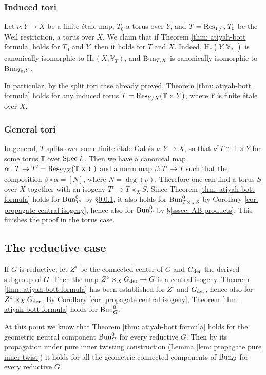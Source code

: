\documentclass[reqno]{amsart}
\numberwithin{equation}{subsection}
\theoremstyle{definition}
\def\TT{\mathbb{T}}
\def\VV{\mathbb{V}}
\newcommand{\Bun}{\textup{Bun}}
\newcommand{\Res}{\textup{Res}}
\newcommand\Spec{\textup{Spec}\ }
\newcommand{\der}{\textup{der}}
\renewcommand\a\alpha
\renewcommand\b\beta
\newcommand{\co}{\colon}
\newcommand{\rH}{\ensuremath{\mathrm{H}}\xspace}
\begin{document}
\subsubsection{Induced tori}\label{sss:induced tori}
Let $\nu: Y\to X$ be a finite \'etale map, $T_{0}$ a torus over $Y$, and $T=\Res_{Y/X}T_{0}$ be the Weil restriction, a torus over $X$. We claim that if Theorem \ref{thm: atiyah-bott formula} holds for $T_{0}$ and $Y$, then it holds for $T$ and $X$. Indeed, $\rH_{*}(Y,\VV_{T_{0}})$ is canonically isomorphic to $\rH_{*}(X,\VV_{T})$, and $\Bun_{T,X}$ is canonically isomorphic to $\Bun_{T_{0},Y}$. 

In particular, by the split tori case already proved, Theorem \ref{thm: atiyah-bott formula} holds for any induced torus $T=\Res_{Y/X}(\TT\times Y)$, where $Y$ is finite \'etale over $X$.  


\subsubsection{General tori}
In general, $T$ splits over some finite \'etale Galois $\nu \co  Y \rightarrow X$, so that $\nu^{*}T\cong \TT\times Y$ for some torus $\TT$ over $\Spec k$. Then we have a canonical map $\a: T\to T'=\Res_{Y/X}(\TT\times Y)$ and a norm map $\b: T'\to T$ such that the composition $\b\circ\a=[N]$, where $N=\deg(\nu)$. Therefore one can find a torus $S$ over $X$ together with an isogeny $T'\to T\times_{X} S$. Since Theorem \ref{thm: atiyah-bott formula} holds for $\Bun^{0}_{T'}$ by \S\ref{sss:induced tori}, it also holds for $\Bun_{T\times_{X} S}^{0}$ by Corollary \ref{cor: propagate central isogeny}, hence also for $\Bun^{0}_{T}$ by \S\ref{sssec: AB products}. This finishes the proof in the torus case. 



\subsection{The reductive case}
If $G$ is reductive, let $Z^\circ$ be the connected center of $G$ and $G_{\der}$ the derived subgroup of $G$. Then the map $Z^\circ \times_X G_{\der} \rightarrow G$ is a central isogeny. Theorem \ref{thm: atiyah-bott formula} has been established for $Z^\circ$ and $G_{\der}$, hence also for $Z^\circ \times_X G_{\der}$. By Corollary \ref{cor: propagate central isogeny}, Theorem \ref{thm: atiyah-bott formula} holds for $\Bun_G^0$.

At this point we know that Theorem \ref{thm: atiyah-bott formula} holds for the geometric neutral component $\Bun_G^0$ for every reductive $G$. Then by its propagation under pure inner twisting construction (Lemma \ref{lem: propagate pure inner twist}) it holds for all the geometric connected components of $\Bun_G$ for every reductive $G$. 
\end{document}
